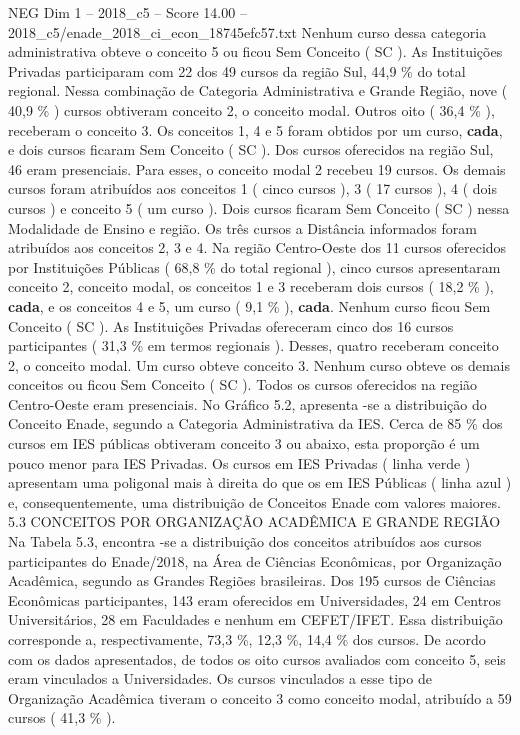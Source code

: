 \begin{textsample}{NEG Dim 1 – 2018\_c5 – Score 14.00 – 2018\_c5/enade\_2018\_ci\_econ\_18745efc57.txt}
Nenhum curso dessa categoria administrativa obteve o conceito 5 ou ficou Sem Conceito ( SC ).
As Instituições Privadas participaram com 22 dos 49 cursos da região Sul, 44,9 \% do total regional.
Nessa combinação de Categoria Administrativa e Grande Região, nove ( 40,9 \% ) cursos obtiveram conceito 2, o conceito modal.
Outros oito ( 36,4 \% ), receberam o conceito 3.
Os conceitos 1, 4 e 5 foram obtidos por um curso, \textbf{cada}, e dois cursos ficaram Sem Conceito ( SC ).
Dos cursos oferecidos na região Sul, 46 eram presenciais.
Para esses, o conceito modal 2 recebeu 19 cursos.
Os demais cursos foram atribuídos aos conceitos 1 ( cinco cursos ), 3 ( 17 cursos ), 4 ( dois cursos ) e conceito 5 ( um curso ).
Dois cursos ficaram Sem Conceito ( SC ) nessa Modalidade de Ensino e região.
Os três cursos a Distância informados foram atribuídos aos conceitos 2, 3 e 4.
Na região Centro-Oeste dos 11 cursos oferecidos por Instituições Públicas ( 68,8 \% do total regional ), cinco cursos apresentaram conceito 2, conceito modal, os conceitos 1 e 3 receberam dois cursos ( 18,2 \% ), \textbf{cada}, e os conceitos 4 e 5, um curso ( 9,1 \% ), \textbf{cada}.
Nenhum curso ficou Sem Conceito ( SC ).
As Instituições Privadas ofereceram cinco dos 16 cursos participantes ( 31,3 \% em termos regionais ).
Desses, quatro receberam conceito 2, o conceito modal.
Um curso obteve conceito 3.
Nenhum curso obteve os demais conceitos ou ficou Sem Conceito ( SC ).
Todos os cursos oferecidos na região Centro-Oeste eram presenciais.
No Gráfico 5.2, apresenta -se a distribuição do Conceito Enade, segundo a Categoria Administrativa da IES.
Cerca de 85 \% dos cursos em IES públicas obtiveram conceito 3 ou abaixo, esta proporção é um pouco menor para IES Privadas.
Os cursos em IES Privadas ( linha verde ) apresentam uma poligonal mais à direita do que os em IES Públicas ( linha azul ) e, consequentemente, uma distribuição de Conceitos Enade com valores maiores. 5.3 CONCEITOS POR ORGANIZAÇÃO ACADÊMICA E GRANDE REGIÃO Na Tabela 5.3, encontra -se a distribuição dos conceitos atribuídos aos cursos participantes do Enade/2018, na Área de Ciências Econômicas, por Organização Acadêmica, segundo as Grandes Regiões brasileiras.
Dos 195 cursos de Ciências Econômicas participantes, 143 eram oferecidos em Universidades, 24 em Centros Universitários, 28 em Faculdades e nenhum em CEFET/IFET.
Essa distribuição corresponde a, respectivamente, 73,3 \%, 12,3 \%, 14,4 \% dos cursos.
De acordo com os dados apresentados, de todos os oito cursos avaliados com conceito 5, seis eram vinculados a Universidades.
Os cursos vinculados a esse tipo de Organização Acadêmica tiveram o conceito 3 como conceito modal, atribuído a 59 cursos ( 41,3 \% ).

\end{textsample}
